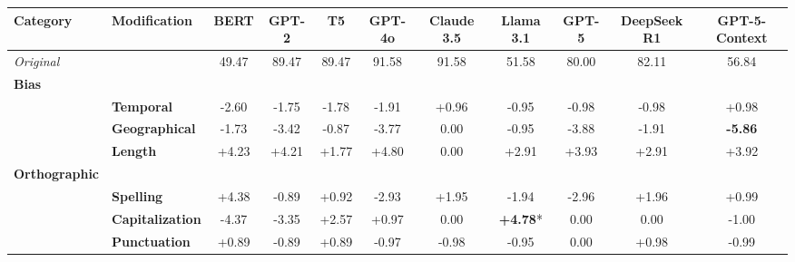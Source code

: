 \begin{table}[h]
\centering
\footnotesize
\begin{adjustbox}{max width=\linewidth}
\begin{tabular}{llccccccccc}
\hline
Category & Modification & \textbf{BERT} & \textbf{GPT-2} & \textbf{T5} & \textbf{GPT-4o} & \textbf{Claude 3.5} & \textbf{Llama 3.1} & \textbf{GPT-5} & \textbf{DeepSeek R1} & \textbf{GPT-5-Context} \\
\hline
\rowcolor{gray!20}\textit{Original} & & 49.47 & 89.47 & 89.47 & 91.58 & 91.58 & 51.58 & 80.00 & 82.11 & 56.84 \\
\textbf{Bias} & & & & & & & \\
& \textbf{Temporal} & \cellcolor{red!7} -2.60 & \cellcolor{red!5} -1.75 & \cellcolor{red!5} -1.78 & \cellcolor{red!5} -1.91 & \cellcolor{green!2} +0.96 & \cellcolor{red!2} -0.95 & \cellcolor{red!2} -0.98 & \cellcolor{red!2} -0.98 & \cellcolor{green!2} +0.98 \\
& \textbf{Geographical} & \cellcolor{red!5} -1.73 & \cellcolor{red!10} -3.42 & \cellcolor{red!2} -0.87 & \cellcolor{red!11} -3.77 & \cellcolor{red!0} 0.00 & \cellcolor{red!2} -0.95 & \cellcolor{red!11} -3.88 & \cellcolor{red!5} -1.91 & \cellcolor{red!17} \textbf{-5.86} \\
& \textbf{Length} & \cellcolor{green!12} +4.23 & \cellcolor{green!12} +4.21 & \cellcolor{green!5} +1.77 & \cellcolor{green!14} +4.80 & \cellcolor{red!0} 0.00 & \cellcolor{green!8} +2.91 & \cellcolor{green!11} +3.93 & \cellcolor{green!8} +2.91 & \cellcolor{green!11} +3.92 \\
\textbf{Orthographic} & & & & & & & \\
& \textbf{Spelling} & \cellcolor{green!13} +4.38 & \cellcolor{red!2} -0.89 & \cellcolor{green!2} +0.92 & \cellcolor{red!8} -2.93 & \cellcolor{green!5} +1.95 & \cellcolor{red!5} -1.94 & \cellcolor{red!8} -2.96 & \cellcolor{green!5} +1.96 & \cellcolor{green!2} +0.99 \\
& \textbf{Capitalization} & \cellcolor{red!13} -4.37 & \cellcolor{red!10} -3.35 & \cellcolor{green!7} +2.57 & \cellcolor{green!2} +0.97 & \cellcolor{red!0} 0.00 & \cellcolor{green!14} \textbf{+4.78}* & \cellcolor{red!0} 0.00 & \cellcolor{red!0} 0.00 & \cellcolor{red!2} -1.00 \\
& \textbf{Punctuation} & \cellcolor{green!2} +0.89 & \cellcolor{red!2} -0.89 & \cellcolor{green!2} +0.89 & \cellcolor{red!2} -0.97 & \cellcolor{red!2} -0.98 & \cellcolor{red!2} -0.95 & \cellcolor{red!0} 0.00 & \cellcolor{green!2} +0.98 & \cellcolor{red!2} -0.99 \\

\end{tabular}
\end{adjustbox}
\end{table}

